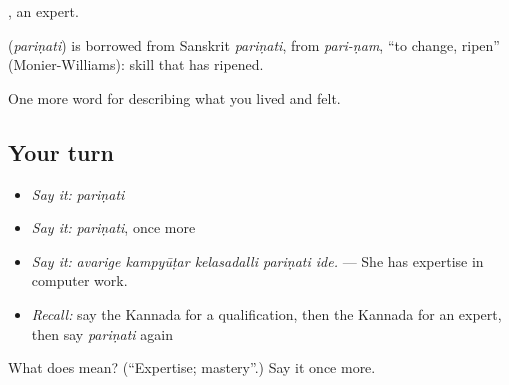 , an expert.

\begin{cousinweb}
\textbf{} (\emph{pariṇati}) is borrowed from Sanskrit \emph{pariṇati}, from \emph{pari-ṇam}, \textquotedblleft{}to change, ripen\textquotedblright{} (Monier-Williams): skill that has ripened.
\end{cousinweb}

\begin{grammarlens}[title={What you've built}]
One more word for describing what you lived and felt.
\end{grammarlens}

\subsection*{Your turn}
\begin{itemize}
\raggedright
  \item \emph{Say it:} \emph{pariṇati}
  \item \emph{Say it:} \emph{pariṇati}, once more
  \item \emph{Say it:} \emph{avarige kampyūṭar kelasadalli pariṇati ide.} — She has expertise in computer work.
  \item \emph{Recall:} say the Kannada for a qualification, then the Kannada for an expert, then say \emph{pariṇati} again
\end{itemize}

\begin{tcolorbox}[breakable,colback=teal!4,colframe=teal!35!black,title={Before you move on}]
What does  mean? (\textquotedblleft{}Expertise; mastery\textquotedblright{}.) Say it once more.
\end{tcolorbox}
